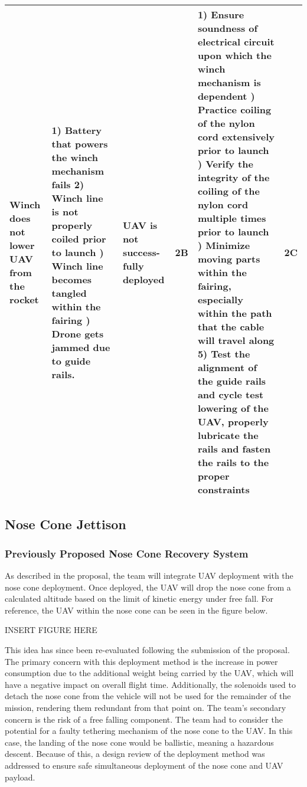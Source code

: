 \begin{table}[H]
{\begin{tabularx}{\linewidth}{XXXlXl}
    Winch does not lower UAV from the rocket & 1) Battery that powers the winch mechanism fails 2) Winch line is not properly coiled prior to launch \newline 3) Winch line becomes tangled within the fairing \newline 4) Drone gets jammed due to guide rails. & UAV is not success-fully deployed & \cellcolor{red!25} 2B & 1) Ensure soundness of electrical circuit upon which the winch mechanism is dependent \newline 2) Practice coiling of the nylon cord extensively prior to launch \newline 3) Verify the integrity of the coiling of the nylon cord multiple times prior to launch \newline 4) Minimize moving parts within the fairing, especially within the path that the cable will travel along 5) Test the alignment of the guide rails and cycle test lowering of the UAV, properly lubricate the rails and fasten the rails to the proper constraints & \cellcolor{orange!25} 2C \\
    \bottomrule
    \end{tabularx}
    }
\end{table}
	

	\subsection{Nose Cone Jettison}
		\subsubsection{Previously Proposed Nose Cone Recovery System}
            As described in the proposal, the team will integrate UAV deployment with the nose cone deployment. Once deployed, the UAV will drop the nose cone from a calculated altitude based on the limit of kinetic energy under free fall. For reference, the UAV within the nose cone can be seen in the figure below.

            INSERT FIGURE HERE
        
            This idea has since been re-evaluated following the submission of the proposal. The primary concern with this deployment method is the increase in power consumption due to the additional weight being carried by the UAV, which will have a negative impact on overall flight time. Additionally, the solenoids used to detach the nose cone from the vehicle will not be used for the remainder of the mission, rendering them redundant from that point on. The team’s secondary concern is the risk of a free falling component. The team had to consider the potential for a faulty tethering mechanism of the nose cone to the UAV. In this case, the landing of the nose cone would be ballistic, meaning a hazardous descent. Because of this, a design review of the deployment method was addressed to ensure safe simultaneous deployment of the nose cone and UAV payload. 

